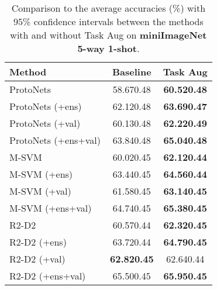\documentclass[10pt,twocolumn,letterpaper]{article}
\begin{document}
\begin{table}[t]
\caption{Comparison to the average accuracies (\%) with 95\% confidence intervals between the methods with and without Task Aug on \textbf{miniImageNet 5-way 1-shot}.}
\label{miniImageNet_1shot}
\begin{center}
\begin{tabular}{lcc}
\toprule[1pt]
\textbf{Method} & Baseline & Task Aug\\
\hline
ProtoNets~\cite{snell2017prototypical} & 58.670.48 & \textbf{60.520.48}\\
ProtoNets (+ens) & 62.120.48 & \textbf{63.690.47}\\
ProtoNets (+val) & 60.130.48 & \textbf{62.220.49}\\
ProtoNets (+ens+val) & 63.840.48 & \textbf{65.040.48}\\
\hline
M-SVM~\cite{lee2019meta} & 60.020.45 & \textbf{62.120.44}\\
M-SVM (+ens) & 63.440.45 & \textbf{64.560.44}\\
M-SVM (+val) & 61.580.45 & \textbf{63.140.45}\\
M-SVM (+ens+val) & 64.740.45 & \textbf{65.380.45}\\
\hline
R2-D2~\cite{bertinetto2018meta} & 60.570.44 & \textbf{62.320.45}\\
R2-D2 (+ens) & 63.720.44 & \textbf{64.790.45}\\
R2-D2 (+val) & \textbf{62.820.45} &62.640.44\\
R2-D2 (+ens+val) & 65.500.45 & \textbf{65.950.45}\\
\bottomrule[1pt]
\end{tabular}
\end{center}
\end{table}
\end{document}

